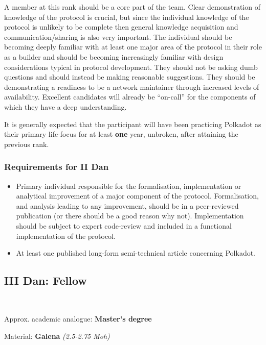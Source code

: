 \documentclass[9pt,oneside]{amsart}
\begin{document}
A member at this rank should be a core part of the team. Clear demonstration of knowledge of the protocol is crucial, but since the individual knowledge of the protocol is unlikely to be complete then general knowledge acquisition and communication/sharing is also very important. The individual should be becoming deeply familiar with at least one major area of the protocol in their role as a builder and should be becoming increasingly familiar with design considerations typical in protocol development. They should not be asking dumb questions and should instead be making reasonable suggestions. They should be demonstrating a readiness to be a network maintainer through increased levels of availability. Excellent candidates will already be ``on-call'' for the components of which they have a deep understanding.

It is generally expected that the participant will have been practicing Polkadot as their primary life-focus for at least \textbf{one} year, unbroken, after attaining the previous rank.

\subsubsection{Requirements for II Dan}\label{requirements-2}

\begin{itemize}
\item Primary individual responsible for the formalisation, implementation or analytical improvement of a major component of the protocol. Formalisation, and analysis leading to any improvement, should be in a peer-reviewed publication (or there should be a good reason why not). Implementation should be subject to expert code-review and included in a functional implementation of the protocol.
\item At least one published long-form semi-technical article concerning Polkadot.
\end{itemize}

\subsection{III Dan: Fellow}\label{iii-dan-fellow}~\\


Approx. academic analogue: \textbf{Master's degree}

Material: \textbf{Galena} \emph{(2.5-2.75 Moh)}
\end{document}
